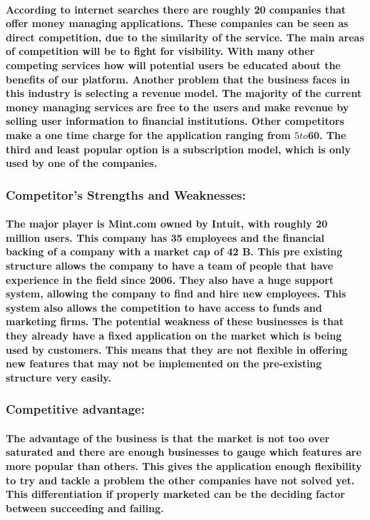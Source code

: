 \documentclass{article}
\begin{document}
\paragraph{\indent According to internet searches there are roughly 20 companies that offer money managing applications. These companies can be seen as direct competition, due to the similarity of the service.  The main areas of competition will be to fight for visibility.  With many other competing services how will potential users be educated about the benefits of our platform. Another problem that the business faces in this industry is selecting a revenue model.  The majority of the current money managing services are free to the users and make revenue by selling user information to financial institutions.  Other competitors make a one time charge for the application ranging from $5 to $60.  The third and least popular option is a subscription model, which is only used by one of the companies.}  

\subsubsection{Competitor’s Strengths and Weaknesses:}
\paragraph{\indent The major player is Mint.com owned by Intuit, with roughly 20 million users.  This company has 35 employees and the financial backing of a company with a market cap of 42 B.  This pre existing structure allows the company to have a team of people that have experience in the field since 2006.  They also have a huge support system, allowing the company to find and hire new employees.  This system also allows the competition to have access to funds and marketing firms.  The potential weakness of these businesses is that they already have a fixed application on the market which is being used by customers.  This means that they are not flexible in offering new features that may not be implemented on the pre-existing structure very easily.}


\subsubsection{Competitive advantage:}
\paragraph{\indent The advantage of the business is that the market is not too over saturated and there are enough businesses to gauge which features are more popular than others.  This gives the application enough flexibility to try and tackle a problem the other companies have not solved yet.  This differentiation if properly marketed can be the deciding factor between succeeding and failing.}
\end{document}
